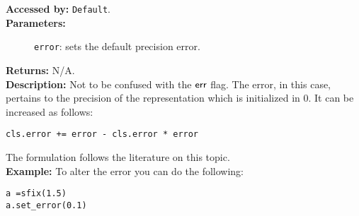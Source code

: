 			\textbf{Accessed by:} \verb|Default|.		 \\
			\textbf{Parameters:}
			\begin{description}
				\item[]\verb|error|:  sets the default precision error. 
			\end{description}
			\textbf{Returns:} N/A. \\
			\textbf{Description:} Not to be confused with the 
$\mathsf{err}$ flag. The error, in this case, pertains to the precision of the representation which is initialized in 0. It can be increased as follows:
\begin{lstlisting}							
cls.error += error - cls.error * error
\end{lstlisting}
			The formulation follows the literature on this topic. \\
			\textbf{Example:}      
			To alter the error you can do the following:			
\begin{lstlisting}
a =sfix(1.5)
a.set_error(0.1)
\end{lstlisting}
		
